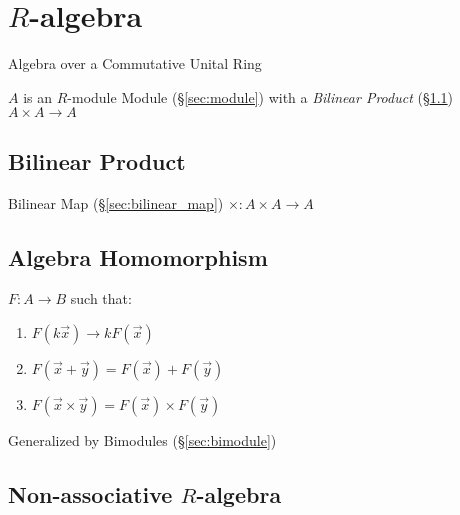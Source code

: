 {{%
\section{$R$-algebra}\label{sec:r_algebra}

Algebra over a Commutative Unital Ring

$A$ is an $R$-module Module (\S\ref{sec:module}) with a \emph{Bilinear Product}
(\S\ref{sec:bilinear_product}) $A \times A \rightarrow A$




\subsection{Bilinear Product}\label{sec:bilinear_product}

Bilinear Map (\S\ref{sec:bilinear_map}) $\times : A \times A \rightarrow A$



\subsection{Algebra Homomorphism}\label{sec:algebra_homomorphism}

$F : A \rightarrow B$ such that:
\begin{enumerate}
  \item $F(k\vec{x}) \rightarrow kF(\vec{x})$
  \item $F(\vec{x} + \vec{y}) = F(\vec{x}) + F(\vec{y})$
  \item $F(\vec{x} \times \vec{y}) = F(\vec{x}) \times F(\vec{y})$
\end{enumerate}

Generalized by Bimodules (\S\ref{sec:bimodule})



\subsection{Non-associative $R$-algebra}
\label{sec:nonassociative_r_algebra}

}}
